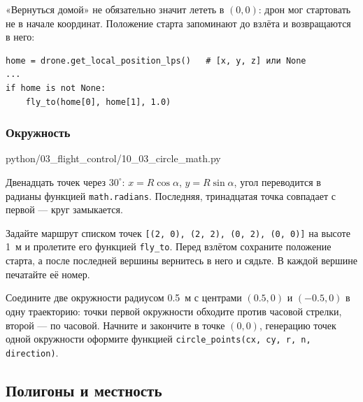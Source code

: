 «Вернуться домой» не обязательно значит лететь в $(0, 0)$: дрон мог стартовать не в начале координат. Положение старта запоминают до взлёта и возвращаются в него:

\begin{codebox}
\begin{verbatim}
home = drone.get_local_position_lps()   # [x, y, z] или None
...
if home is not None:
    fly_to(home[0], home[1], 1.0)
\end{verbatim}
\end{codebox}

\subsubsection*{Окружность}

\begin{codefile}[python]{python/03_flight_control/10_03_circle_math.py}
\end{codefile}

Двенадцать точек через $30^\circ$: $x = R\cos\alpha$, $y = R\sin\alpha$, угол переводится в радианы функцией \verb|math.radians|. Последняя, тринадцатая точка совпадает с первой --- круг замыкается.

\begin{taskbox}
Задайте маршрут списком точек \verb|[(2, 0), (2, 2), (0, 2), (0, 0)]| на высоте 1~м и пролетите его функцией \verb|fly_to|. Перед взлётом сохраните положение старта, а после последней вершины вернитесь в него и сядьте. В каждой вершине печатайте её номер.
\end{taskbox}

\begin{taskbox}[Восьмёрка]
Соедините две окружности радиусом 0.5~м с центрами $(0.5, 0)$ и $(-0.5, 0)$ в одну траекторию: точки первой окружности обходите против часовой стрелки, второй --- по часовой. Начните и закончите в точке $(0, 0)$, генерацию точек одной окружности оформите функцией \verb|circle_points(cx, cy, r, n, direction)|.
\end{taskbox}

\subsection{Полигоны и местность}
\label{sec:python-terrain}

